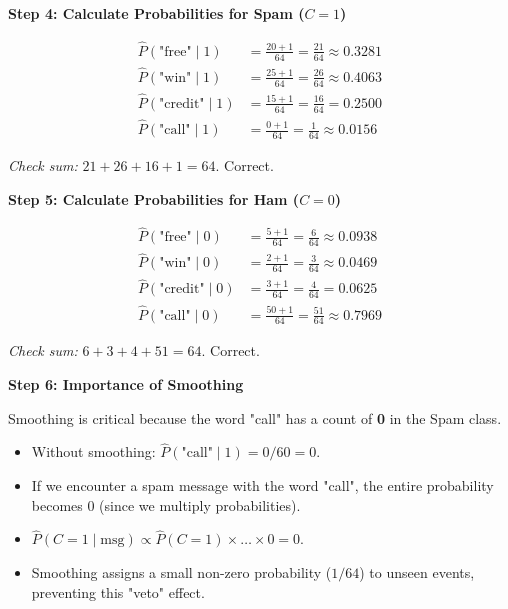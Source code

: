 \documentclass[12pt]{article}
\begin{document}
\begin{solution}
\textbf{Step 4: Calculate Probabilities for Spam ($C=1$)}

\begin{align*}
\hat{P}(\text{"free"} \mid 1) &= \frac{20 + 1}{64} = \frac{21}{64} \approx 0.3281 \\
\hat{P}(\text{"win"} \mid 1) &= \frac{25 + 1}{64} = \frac{26}{64} \approx 0.4063 \\
\hat{P}(\text{"credit"} \mid 1) &= \frac{15 + 1}{64} = \frac{16}{64} = 0.2500 \\
\hat{P}(\text{"call"} \mid 1) &= \frac{0 + 1}{64} = \frac{1}{64} \approx 0.0156
\end{align*}

\textit{Check sum:} $21+26+16+1 = 64$. Correct.

\textbf{Step 5: Calculate Probabilities for Ham ($C=0$)}

\begin{align*}
\hat{P}(\text{"free"} \mid 0) &= \frac{5 + 1}{64} = \frac{6}{64} \approx 0.0938 \\
\hat{P}(\text{"win"} \mid 0) &= \frac{2 + 1}{64} = \frac{3}{64} \approx 0.0469 \\
\hat{P}(\text{"credit"} \mid 0) &= \frac{3 + 1}{64} = \frac{4}{64} = 0.0625 \\
\hat{P}(\text{"call"} \mid 0) &= \frac{50 + 1}{64} = \frac{51}{64} \approx 0.7969
\end{align*}

\textit{Check sum:} $6+3+4+51 = 64$. Correct.

\textbf{Step 6: Importance of Smoothing}

Smoothing is critical because the word "call" has a count of \textbf{0} in the Spam class.
\begin{itemize}
    \item Without smoothing: $\hat{P}(\text{"call"} \mid 1) = 0/60 = 0$.
    \item If we encounter a spam message with the word "call", the entire probability becomes 0 (since we multiply probabilities).
    \item $\hat{P}(C=1 \mid \text{msg}) \propto \hat{P}(C=1) \times \dots \times 0 = 0$.
    \item Smoothing assigns a small non-zero probability ($1/64$) to unseen events, preventing this "veto" effect.
\end{itemize}
\end{solution}
\end{document}
